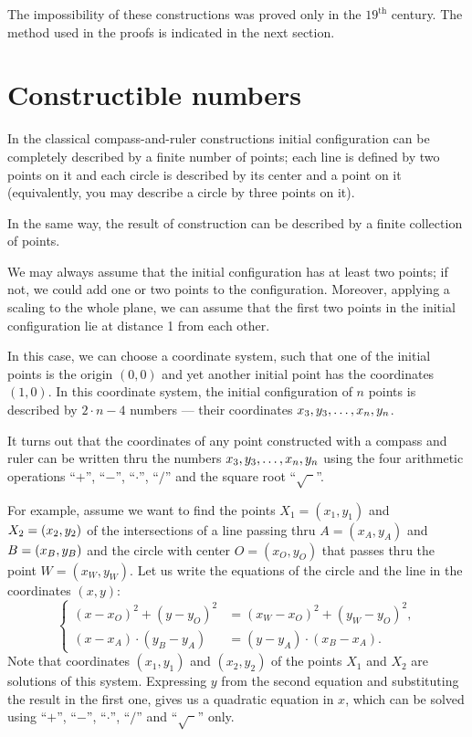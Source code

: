 \medskip

The impossibility of these constructions 
was proved only in the $19^\text{th}$ century.
The method used in the proofs is indicated in the next section.

\section*{Constructible numbers}

In the classical compass-and-ruler constructions initial configuration can be completely described by a finite number of points;
each line is defined by two points on it and each circle is described by its center and a point on it (equivalently, you may describe a circle by three points on it).

In the same way, the result of construction can be described by a finite collection of points.

We may always assume that the initial configuration has at least two points;
if not, we could add one or two points to the configuration.
Moreover, applying a scaling to the whole plane, we can assume that the first two points in the initial configuration lie at distance 1 from each other.

In this case, we can choose a  coordinate system, such that one of the initial points is the origin $(0,0)$ and yet another initial point has the coordinates~$(1,0)$.
In this coordinate system,
the initial configuration of $n$ points is described by 
$2\cdot n-4$ numbers --- their coordinates $x_3,y_3,\z\dots,x_n,y_n$.

\medskip

It turns out that the coordinates of any point constructed with a compass and ruler
can be written thru the numbers $x_3,y_3,\z\dots,x_n,y_n$ using the four arithmetic operations ``$+$'', ``$-$'', ``$\cdot$'', ``$/$''
and the square root ``$\sqrt{\phantom{a}}$''.

For example, assume we want to find the points $X_1=(x_1,y_1)$ and $X_2\z=(x_2,y_2)$ of the intersections of 
a line passing thru $A=(x_A,y_A)$ and $B\z=(x_B,y_B)$ and
the circle with center $O=(x_O,y_O)$ that passes thru the point $W=(x_W,y_W)$.
Let us write the equations of the circle and the line in the coordinates $(x,y)$:
$$
\left\{
\begin{aligned}
(x-x_O)^2+(y-y_O)^2&=(x_W-x_O)^2+(y_W-y_O)^2,
\\
(x-x_A)\cdot(y_B-y_A)&=(y-y_A)\cdot(x_B-x_A).
\end{aligned}
\right.
$$
Note that coordinates $(x_1,y_1)$ and $(x_2,y_2)$ of the points $X_1$ and $X_2$ are solutions of this system.
Expressing $y$ from the second equation and substituting the result in the first one, gives us a quadratic equation in $x$, 
which can be solved using ``$+$'', ``$-$'', ``$\cdot$'', ``$/$''
and  ``$\sqrt{\phantom{a}}$'' only.


